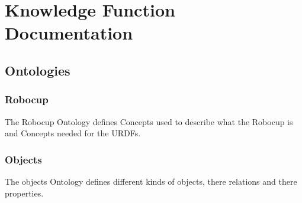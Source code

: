 \documentclass[main.tex]{subfiles}
\begin{document}
	\begingroup

	\renewcommand{\cleardoublepage}{}

	\renewcommand{\clearpage}{}

	\chapter{Knowledge Function Documentation}

		\chapterauthor{}
	  	
	  	\section{Ontologies}
	  	
	  	\subsection{Robocup}
	  	
	  	The Robocup Ontology defines Concepts used to describe what the Robocup is and Concepts needed for the URDFs.
	  	
	  	\subsection{Objects}
	  	
	  	The objects Ontology defines different kinds of objects, there relations and there properties. 

	\endgroup
\end{document}

